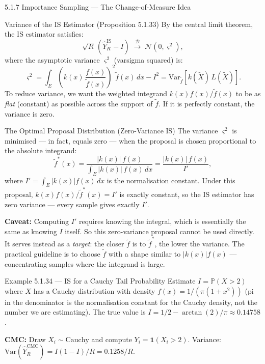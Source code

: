\documentclass[aspectratio=169,10pt]{beamer}
\begin{document}
\begin{frame}[allowframebreaks]{5.1.7 Importance Sampling --- The Change-of-Measure Idea}
\begin{block}{Variance of the IS Estimator (Proposition 5.1.33)}
  By the central limit theorem, the IS estimator satisfies:
  \[
    \sqrt{R}\,(\hat{Y}_R^{\mathrm{IS}} - I)
    \;\xrightarrow{\mathcal{D}}\; \mathcal{N}(0, \varsigma^2),
  \]
  where the asymptotic variance $\varsigma^2$ (varsigma squared) is:
  \[
    \varsigma^2
    = \int_E \!\left(k(x)\,\frac{f(x)}{\tilde{f}(x)}\right)^{\!2}\!\tilde{f}(x)\,dx - I^2
    = \mathrm{Var}_{\tilde{f}}\!\left[k(\tilde{X})\,L(\tilde{X})\right].
  \]
  To reduce variance, we want the weighted integrand $k(x)f(x)/\tilde{f}(x)$
  to be as \emph{flat} (constant) as possible across the support of $\tilde{f}$.
  If it is perfectly constant, the variance is zero.
\end{block}

\framebreak

\begin{block}{The Optimal Proposal Distribution (Zero-Variance IS)}
  The variance $\varsigma^2$ is minimised --- in fact, equals zero --- when
  the proposal is chosen proportional to the absolute integrand:
  \[
    \tilde{f}^*(x) = \frac{|k(x)|\,f(x)}{\displaystyle\int_E |k(x)|\,f(x)\,dx}
    = \frac{|k(x)|\,f(x)}{I'},
  \]
  where $I' = \int_E |k(x)|f(x)\,dx$ is the normalisation constant.
  Under this proposal, $k(x)f(x)/\tilde{f}^*(x) = I'$ is exactly constant,
  so the IS estimator has zero variance --- every sample gives exactly $I'$.

  \textbf{Caveat:} Computing $I'$ requires knowing the integral, which is
  essentially the same as knowing $I$ itself.  So this zero-variance proposal
  cannot be used directly.  It serves instead as a \emph{target}: the closer
  $\tilde{f}$ is to $\tilde{f}^*$, the lower the variance.
  The practical guideline is to choose $\tilde{f}$ with a shape similar to
  $|k(x)|f(x)$ --- concentrating samples where the integrand is large.
\end{block}

\framebreak

\begin{exampleblock}{Example 5.1.34 --- IS for a Cauchy Tail Probability}
  Estimate $I = \mathbb{P}(X > 2)$ where $X$ has a Cauchy distribution
  with density $f(x) = 1/(\pi(1+x^2))$ (pi in the denominator is the
  normalisation constant for the Cauchy density, not the number we are estimating).
  The true value is $I = 1/2 - \arctan(2)/\pi \approx 0.14758$.

  \medskip
  \textbf{CMC:} Draw $X_i \sim \mathrm{Cauchy}$ and compute
  $Y_i = \mathbf{1}(X_i > 2)$.
  Variance: $\mathrm{Var}(\hat{Y}^{\mathrm{CMC}}_R) = I(1-I)/R = 0.1258/R$.


\end{exampleblock}
\end{frame}
\end{document}
